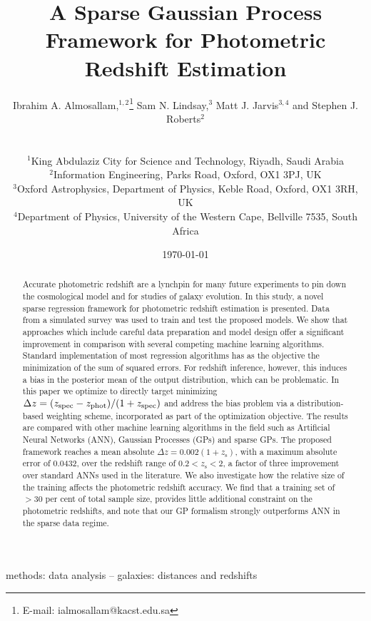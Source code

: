 \documentclass[useAMS,usenatbib,fleqn]{mn2e}
\title[A Sparse GP Framework for Photometric Redshift]{A Sparse Gaussian Process Framework for Photometric Redshift Estimation}
\author[Almosallam et al.]
{\parbox{\textwidth}{Ibrahim A. Almosallam,$^{1,2}$\thanks{E-mail: ialmosallam@kacst.edu.sa} Sam N. Lindsay,$^{3}$ Matt J. Jarvis$^{3,4}$ and Stephen J. Roberts$^{2}$
}
\vspace{0.4cm}\\
\parbox{\textwidth}{
$^1$King Abdulaziz City for Science and Technology, Riyadh, Saudi Arabia\\
$^2$Information Engineering, Parks Road, Oxford, OX1 3PJ, UK\\
$^3$Oxford Astrophysics, Department of Physics, Keble Road, Oxford, OX1 3RH, UK\\
$^4$Department of Physics, University of the Western Cape, Bellville 7535, South Africa\\
}}
\begin{document}
\date{\today}

\pagerange{\pageref{firstpage}--\pageref{lastpage}} 

\maketitle

\label{firstpage}

\begin{abstract}
Accurate photometric redshift are a lynchpin for many future experiments to pin down the cosmological model and for studies of galaxy evolution. In this study, a novel sparse regression framework for photometric redshift estimation is presented. Data from a simulated survey was used to train and test the proposed models. We show that approaches which include careful data preparation and model design offer a significant improvement in comparison with several competing machine learning algorithms. Standard implementation of most regression algorithms has as the objective the minimization of the sum of squared errors. For redshift inference, however, this induces a bias in the posterior mean of the output distribution, which can be problematic. In this paper we optimize to directly target minimizing $\Delta z = (z_{\rm spec} - z_{\rm phot})/(1+z_{\rm spec})$ and address the bias problem via a distribution-based weighting scheme, incorporated as part of the optimization objective. The results are compared with other machine learning algorithms in the field such as Artificial Neural Networks (ANN), Gaussian Processes (GPs) and sparse GPs. The proposed framework reaches a mean absolute $\Delta z = 0.002(1+z_\textrm{s})$, with a maximum absolute error of 0.0432, over the redshift range of $0.2 < z_\textrm{s} < 2$, a factor of three improvement over standard ANNs used in the literature. We also investigate how the relative  size of the training affects the photometric redshift accuracy. We find that a training set of $>$30 per cent of total sample size, provides little additional constraint on the photometric redshifts, and note that our GP formalism strongly outperforms ANN in the sparse data regime.
\end{abstract}

\begin{keywords}
methods: data analysis -- galaxies: distances and redshifts
\end{keywords}
\end{document}
